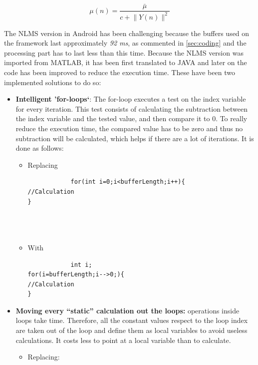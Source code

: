 \documentclass[11pt,a4paper,english]{book}  %
\theoremstyle{definition}  %
\theoremstyle{plain}  %
\theoremstyle{remark}  %
\begin{document}
		
		
	\begin{equation}
	\label{eq:nlms}
		\mu (n)=\frac{\bar{\mu}}{c+\lVert Y(n)\rVert^2}
	\end{equation}
	
	The NLMS version in Android has been challenging because the buffers used on the framework last approximately \textit{92 ms}, as commented in \ref{sec:coding} and the processing part has to last less than this time. Because the NLMS version was imported from MATLAB, it has been first translated to JAVA and later on the code has been improved to reduce the execution time. These have been two implemented solutions to do so:
	
	\begin{itemize}
	\item \textbf{Intelligent 'for-loops`}: The for-loop executes a test on the index variable for every iteration. This test consists of calculating the subtraction between the index variable and the tested value, and then compare it to $0$. To really reduce the execution time, the compared value has to be zero and thus no subtraction will be calculated, which helps if there are a lot of iterations. It is done as follows:
	
		\begin{itemize}
			\item Replacing
			
			\begin{lstlisting}
			for(int i=0;i<bufferLength;i++){
//Calculation
}

			
			
			\end{lstlisting}
			
			\item With
			
			\begin{lstlisting}
			int i;
for(i=bufferLength;i-->0;){
//Calculation
}

			\end{lstlisting}
		\end{itemize}
	
	\item \textbf{Moving every “static” calculation out the loops:}  operations inside loops take time. Therefore, all the constant values respect to the loop index are taken out of the loop and define them as local variables to avoid useless calculations. It costs less to point at a local variable than to calculate.
	
	\begin{itemize}
	\item Replacing:
	

\end{itemize}
\end{itemize}
\end{document}
